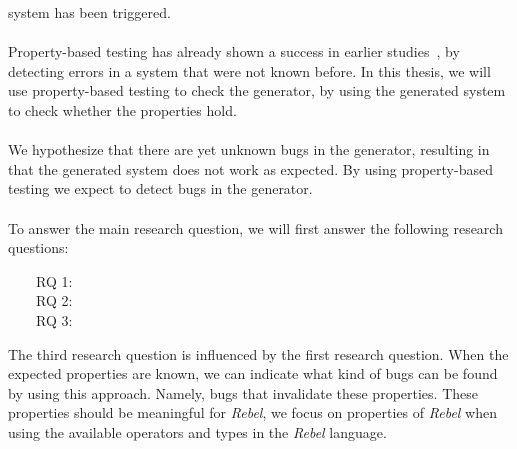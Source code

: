 system has been triggered.\\
\\
Property-based testing has already shown a success in earlier
studies~\cite{fink1997property,claessen2011quickcheck,arts2006testing}, by
detecting errors in a system that were not known before. In this thesis, we will
use property-based testing to check the generator, by using the generated system
to check whether the properties hold.\\
\\
We hypothesize that there are yet unknown bugs in the generator, resulting in
that the generated system does not work as expected. By using property-based
testing we expect to detect bugs in the generator.\\
\\
To answer the main research question, we will first answer the following
research questions:
\begin{description}
\item[~~~~RQ 1:] \rqOne
\item[~~~~RQ 2:] \rqTwo
\item[~~~~RQ 3:] \rqThree
\end{description}
The third research question is influenced by the first research question. When the expected properties are known, we can indicate what kind of bugs can be found by using this approach. Namely, bugs that invalidate these properties. These properties should be meaningful for \textit{Rebel}, we focus on properties of \textit{Rebel} when using the available operators and types in the \textit{Rebel} language.

